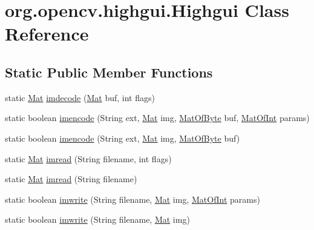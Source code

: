 \hypertarget{classorg_1_1opencv_1_1highgui_1_1_highgui}{}\section{org.\+opencv.\+highgui.\+Highgui Class Reference}
\label{classorg_1_1opencv_1_1highgui_1_1_highgui}
\subsection*{Static Public Member Functions}
\begin{DoxyCompactItemize}
\item 
static \mbox{\hyperlink{classorg_1_1opencv_1_1core_1_1_mat}{Mat}} \mbox{\hyperlink{classorg_1_1opencv_1_1highgui_1_1_highgui_a6d7448d231f18708a101435c0eef2a09}{imdecode}} (\mbox{\hyperlink{classorg_1_1opencv_1_1core_1_1_mat}{Mat}} buf, int flags)
\item 
static boolean \mbox{\hyperlink{classorg_1_1opencv_1_1highgui_1_1_highgui_a884983c417b1783e2463afbce0ac7581}{imencode}} (String ext, \mbox{\hyperlink{classorg_1_1opencv_1_1core_1_1_mat}{Mat}} img, \mbox{\hyperlink{classorg_1_1opencv_1_1core_1_1_mat_of_byte}{Mat\+Of\+Byte}} buf, \mbox{\hyperlink{classorg_1_1opencv_1_1core_1_1_mat_of_int}{Mat\+Of\+Int}} params)
\item 
static boolean \mbox{\hyperlink{classorg_1_1opencv_1_1highgui_1_1_highgui_a953566e88b2a160276647bd2e84c8ed2}{imencode}} (String ext, \mbox{\hyperlink{classorg_1_1opencv_1_1core_1_1_mat}{Mat}} img, \mbox{\hyperlink{classorg_1_1opencv_1_1core_1_1_mat_of_byte}{Mat\+Of\+Byte}} buf)
\item 
static \mbox{\hyperlink{classorg_1_1opencv_1_1core_1_1_mat}{Mat}} \mbox{\hyperlink{classorg_1_1opencv_1_1highgui_1_1_highgui_abca0208ca1f1e3966c0b87d537dcb3f6}{imread}} (String filename, int flags)
\item 
static \mbox{\hyperlink{classorg_1_1opencv_1_1core_1_1_mat}{Mat}} \mbox{\hyperlink{classorg_1_1opencv_1_1highgui_1_1_highgui_a5a6663aa4361aeee0ac48902d46a15f6}{imread}} (String filename)
\item 
static boolean \mbox{\hyperlink{classorg_1_1opencv_1_1highgui_1_1_highgui_a096ee9b12d8d232cf9b93b69f765c0be}{imwrite}} (String filename, \mbox{\hyperlink{classorg_1_1opencv_1_1core_1_1_mat}{Mat}} img, \mbox{\hyperlink{classorg_1_1opencv_1_1core_1_1_mat_of_int}{Mat\+Of\+Int}} params)
\item 
static boolean \mbox{\hyperlink{classorg_1_1opencv_1_1highgui_1_1_highgui_ab3f296e86b1e2348d4d9325cab008f01}{imwrite}} (String filename, \mbox{\hyperlink{classorg_1_1opencv_1_1core_1_1_mat}{Mat}} img)
\end{DoxyCompactItemize}
